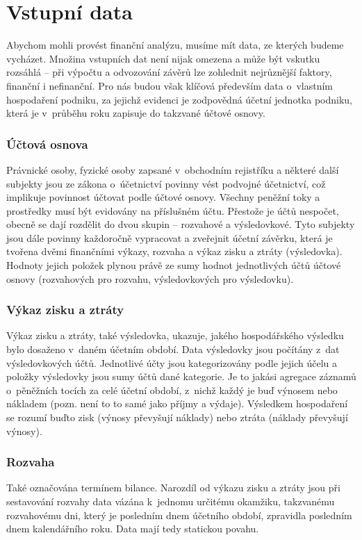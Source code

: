 \section{Vstupní data}
Abychom mohli provést finanční analýzu, musíme mít data, ze kterých budeme vycházet. Množina vstupních dat není nijak omezena a může být vskutku rozsáhlá -- při výpočtu a odvozování závěrů lze zohlednit nejrůznější faktory, finanční i nefinanční. Pro nás budou však klíčová především data o~vlastním hospodaření podniku, za jejichž evidenci je zodpovědná účetní jednotka podniku, která je v~průběhu roku zapisuje do takzvané účtové osnovy.

\subsubsection{Účtová osnova}
Právnické osoby, fyzické osoby zapsané v~obchodním rejistříku a některé další subjekty jsou ze zákona o~účetnictví povinny vést podvojné účetnictví, což implikuje povinnost účtovat podle účtové osnovy.
Všechny peněžní toky a prostředky musí být evidovány na příslušném účtu. Přestože je účtů nespočet, obecně se dají rozdělit do dvou skupin -- rozvahové a výsledovkové. Tyto subjekty jsou dále povinny každoročně vypracovat a zveřejnit účetní závěrku, která je tvořena dvěmi finančními výkazy, rozvaha a výkaz zisku a ztráty (výsledovka).
Hodnoty jejich položek plynou právě ze sumy hodnot jednotlivých účtů účtové osnovy (rozvahových pro rozvahu, výsledovkových pro výsledovku).

\subsubsection{Výkaz zisku a ztráty}
Výkaz zisku a ztráty, také výsledovka, ukazuje, jakého hospodářského výsledku bylo dosaženo v~daném účetním období. Data výsledovky jsou počítány z~dat výsledovkových účtů. Jednotlivé účty jsou kategorizovány podle jejich účelu a položky výsledovky jsou sumy účtů dané kategorie. Je to jakási agregace záznamů o~pěněžních tocích za celé účetní období, z~nichž každý je buď výnosem nebo nákladem (pozn. není to to samé jako příjmy a výdaje). Výsledkem hospodaření se rozumí buďto zisk (výnosy převyšují náklady) nebo ztráta (náklady převyšují výnosy).

\subsubsection{Rozvaha}
Také označována termínem bilance. Narozdíl od výkazu zisku a ztráty jsou při sestavování rozvahy data vázána k~jednomu určitému okamžiku, takzvanému rozvahovému dni, který je posledním dnem účetního období, zpravidla posledním dnem kalendářního roku. Data mají tedy statickou povahu.

